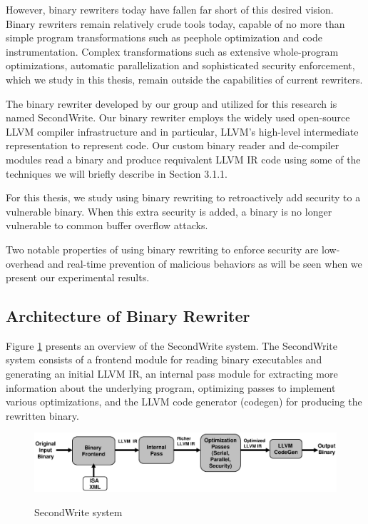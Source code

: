 However, binary rewriters today have fallen far short of this desired vision. Binary rewriters
remain relatively crude tools today, capable of no more than simple program transformations such as
peephole optimization and code instrumentation. Complex transformations such as extensive
whole-program optimizations, automatic parallelization and sophisticated security enforcement, which
we study in this thesis, remain outside the capabilities of current rewriters.

The binary rewriter developed by our group and utilized for this research is named SecondWrite. Our
binary rewriter employs the widely used open-source LLVM compiler infrastructure and in particular,
LLVM's high-level intermediate representation to represent code. Our custom binary reader and
de-compiler modules read a binary and produce requivalent LLVM IR code using some of the techniques
we will briefly describe in Section 3.1.1.

For this thesis, we study using binary rewriting to retroactively add security to a vulnerable
binary. When this extra security is added, a binary is no longer vulnerable to common buffer
overflow attacks.

Two notable properties of using binary rewriting to enforce security are low-overhead and real-time
prevention of malicious behaviors as will be seen when we present our experimental results.

\subsection{Architecture of Binary Rewriter}

Figure \ref{swoverview} presents an overview of the SecondWrite system. The SecondWrite system consists of a
frontend module for reading binary executables and generating an initial LLVM IR, an internal pass
module for extracting more information about the underlying program, optimizing passes to implement
various optimizations, and the LLVM code generator (codegen) for producing the rewritten binary.

\begin{figure}
\begin{center}
\includegraphics[scale=0.65]{sw_overview.eps}
\end{center}
\renewcommand{\baselinestretch}{1}
\small\normalsize
\begin{quote}
\caption{SecondWrite system}
\label{swoverview}
\end{quote}
\end{figure}
\renewcommand{\baselinestretch}{2}
\small\normalsize

